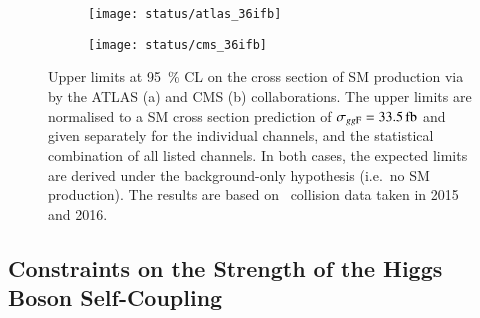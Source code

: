 \begin{figure}[htbp]
  \centering

  \begin{subfigure}[b]{0.9\textwidth}
    \centering

    \texttt{[image: status/atlas\_36ifb]}

  \end{subfigure}

  \vspace{0.5em}

  \begin{subfigure}[b]{0.9\textwidth}
    \centering

    \texttt{[image: status/cms\_36ifb]}

  \end{subfigure}

  \caption[Upper limits on the SM~\HH production cross section by the ATLAS and
  CMS collaborations based on \pp~collision data taken in 2015 and 2016]{Upper
    limits at \SI{95}{\percent} CL on the cross section of SM \HH production via
    \ggF by the ATLAS (a) and CMS (b) collaborations. The upper limits are
    normalised to a SM cross section prediction of
    $\sigma_{\ggF} = \SI{33.5}{\femto\barn}$ and given separately for the
    individual channels, and the statistical combination of all listed
    channels. In both cases, the expected limits are derived under the
    background-only hypothesis (i.e.\ no SM \HH production). The results are
    based on \pp~collision data taken in 2015 and 2016.}%
  \label{fig:prior_status_smhh}
\end{figure}


\subsection*{Constraints on the Strength of the Higgs Boson Self-Coupling}%
\label{sec:past_results_klambda}

